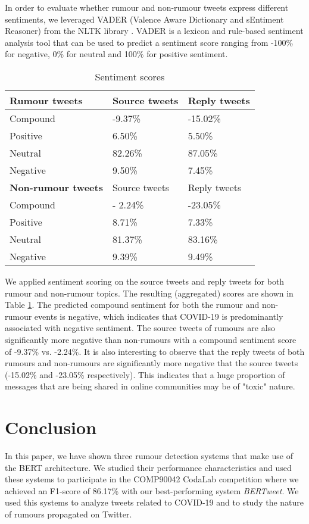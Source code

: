 \documentclass[11pt,a4paper]{article}
\begin{document}
In order to evaluate whether rumour and non-rumour tweets express different sentiments, we leveraged VADER (Valence Aware Dictionary and sEntiment Reasoner) from the NLTK library \citep{RN693}. VADER is a lexicon and rule-based sentiment analysis tool that can be used to predict a sentiment score ranging from -100\% for negative, 0\% for neutral and 100\% for positive sentiment. 
\begin{table}[]
\small
\begin{tabular}{lll}
\hline
\textbf{Rumour tweets} & Source tweets & Reply tweets \\ \hline
Compound & -9.37\% & -15.02\% \\
Positive & 6.50\% & 5.50\% \\
Neutral & 82.26\% & 87.05\% \\
Negative & 9.50\% & 7.45\% \\ \hline
\textbf{Non-rumour tweets} & Source tweets & Reply tweets \\ \hline
Compound & - 2.24\%  & -23.05\% \\
Positive & 8.71\% & 7.33\% \\
Neutral & 81.37\% & 83.16\% \\
Negative & 9.39\% & 9.49\%\\ \hline
\end{tabular}
\caption{Sentiment scores}
\label{tab:sentiment-scores}
\end{table}
We applied sentiment scoring on the source tweets and reply tweets for both rumour and non-rumour topics. The resulting (aggregated) scores are shown in Table \ref{tab:sentiment-scores}. 
\newline
The predicted compound sentiment for both the rumour and non-rumour events is negative, which indicates that COVID-19 is predominantly associated with negative sentiment. The source tweets of rumours are also significantly more negative than non-rumours with a compound sentiment score of -9.37\% vs. -2.24\%.
\newline
It is also interesting to observe that the reply tweets of both rumours and non-rumours are significantly more negative that the source tweets (-15.02\% and -23.05\% respectively). This indicates that a huge proportion of messages that are being shared in online communities may be of "toxic" nature.

\section{Conclusion}
In this paper, we have shown three rumour detection systems that make use of the BERT architecture. We studied their performance characteristics and used these systems to participate in the COMP90042 CodaLab competition where we achieved an F1-score of 86.17\% with our best-performing system \textit{BERTweet}. We used this systems to analyze tweets related to COVID-19 and to study the nature of rumours propagated on Twitter.


\newpage



\end{document}
